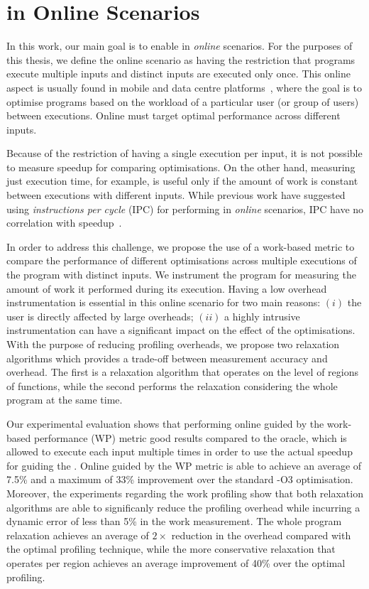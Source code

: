 \section{{\IterComp} in Online Scenarios}

In this work, our main goal is to enable {\itercomp} in \textit{online} scenarios.
For the purposes of this thesis, we define the online scenario as having the restriction that programs execute multiple inputs and distinct inputs are executed only once.
This online aspect is usually found in mobile and data centre platforms~\citep{chen12b,fang15,mpeis16}, where the goal is to optimise programs based on the workload of a particular user (or group of users) between executions.
Online {\itercomp} must target optimal performance across different inputs.

Because of the restriction of having a single execution per input, it is not possible to measure speedup for comparing optimisations.
On the other hand, measuring just execution time, for example, is useful only if the amount of work is constant between executions with different inputs.
While previous work have suggested using \textit{instructions per cycle} (IPC) for performing {\itercomp} in \textit{online} scenarios, IPC have no correlation with speedup~\citep{fursin07}.

In order to address this challenge, we propose the use of a work-based metric to compare the performance of different optimisations across multiple executions of the program with distinct inputs.
We instrument the program for measuring the amount of work it performed during its execution.
Having a low overhead instrumentation is essential in this online scenario for two main reasons:
$(i)$ the user is directly affected by large overheads;
$(ii)$ a highly intrusive instrumentation can have a significant impact on the effect of the optimisations.
With the purpose of reducing profiling overheads, we propose two relaxation algorithms which provides a trade-off between measurement accuracy and overhead.
The first is a relaxation algorithm that operates on the level of regions of functions, while the second performs the relaxation considering the whole program at the same time.

Our experimental evaluation shows that performing online {\itercomp} guided by the work-based performance (WP) metric good results compared to the oracle, which is allowed to execute each input multiple times in order to use the actual speedup for guiding the {\itercomp}.
Online {\itercomp} guided by the WP metric is able to achieve an average of 7.5\% and a maximum of 33\% improvement over the standard {\flagstype -O3} optimisation.
Moreover, the experiments regarding the work profiling show that both relaxation algorithms are able to significanly reduce the profiling overhead while incurring a dynamic error of less than 5\% in the work measurement.
The whole program relaxation achieves an average of $2\times$ reduction in the overhead compared with the optimal profiling technique, while the more conservative relaxation that operates per region achieves an average improvement of 40\% over the optimal profiling.

